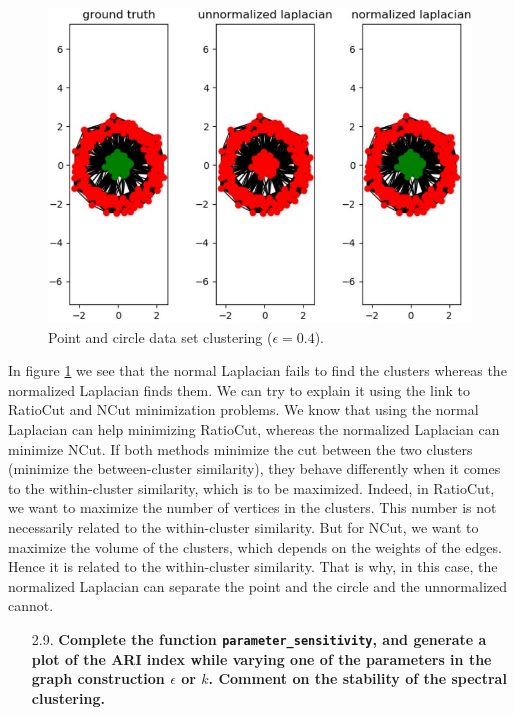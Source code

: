 \documentclass[a4paper, 11pt]{report}
\begin{document}
    \begin{figure}[!h]
        \centering
        \includegraphics[scale=0.65]{images/question_28_results.jpg}
        \caption{Point and circle data set clustering ($\epsilon = 0.4$).}
        \label{fig:question-28-results}
    \end{figure}

    In figure \ref{fig:question-28-results} we see that the normal Laplacian fails to find the clusters whereas the normalized Laplacian finds them. We can try to explain it using the link to RatioCut and NCut minimization problems. We know that using the normal Laplacian can help minimizing RatioCut, whereas the normalized Laplacian can minimize NCut. If both methods minimize the cut between the two clusters (\ie minimize the between-cluster similarity), they behave differently when it comes to the within-cluster similarity, which is to be maximized. Indeed, in RatioCut, we want to maximize the number of vertices in the clusters. This number is not necessarily related to the within-cluster similarity. But for NCut, we want to maximize the volume of the clusters, which depends on the weights of the edges. Hence it is related to the within-cluster similarity. That is why, in this case, the normalized Laplacian can separate the point and the circle and the unnormalized cannot.

\begin{itemize}
    \item[2.9.] \textbf{Complete the function \texttt{parameter\_sensitivity}, and generate a plot of the ARI index while varying one of the parameters in the graph construction $\epsilon$ or $k$. Comment on the stability of the spectral clustering.}
\end{itemize}
\end{document}
